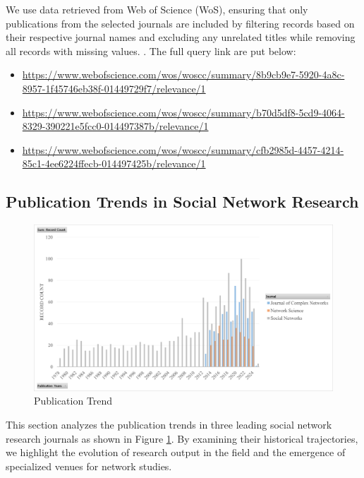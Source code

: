 \documentclass[twocolumn]{article}
\begin{document}
	We use data retrieved from Web of Science (WoS), ensuring that only publications from the selected journals are included by filtering records based on their respective journal names and excluding any unrelated titles while removing all records with missing values. . The full query link are put below: 
	\begin{itemize}
		\item \url{https://www.webofscience.com/wos/woscc/summary/8b9cb9e7-5920-4a8c-8957-1f45746eb38f-01449729f7/relevance/1}
		\item 	\url{https://www.webofscience.com/wos/woscc/summary/b70d5df8-5cd9-4064-8329-390221e5fcc0-014497387b/relevance/1}
		\item 	\url{https://www.webofscience.com/wos/woscc/summary/cfb2985d-4457-4214-85c1-4ee6224ffecb-014497425b/relevance/1}
	\end{itemize}
	
	\subsection{Publication Trends in Social Network Research}
	
	\begin{figure}[htbp]
		\caption{Publication Trend}\label{fig.fig1}
		\includegraphics[width=\linewidth]{images/Record Count Proportion.pdf}
	\end{figure}
	
	This section analyzes the publication trends in three leading social network research journals as shown in Figure \ref{fig.fig1}. By examining their historical trajectories, we highlight the evolution of research output in the field and the emergence of specialized venues for network studies.
	
\end{document}
